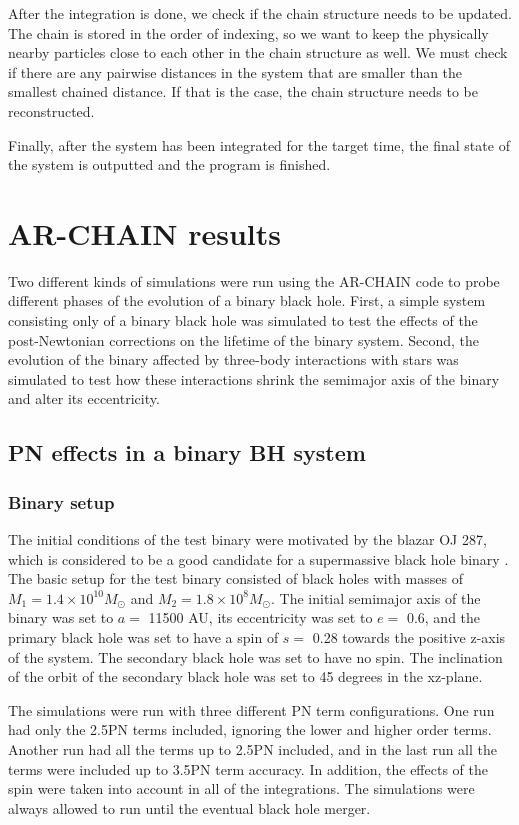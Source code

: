 \documentclass[english, oneside]{HYgradu}
\begin{document}
After the integration is done, we check if the chain structure needs to be updated. The chain is stored in the order of indexing, so we want to keep the physically nearby particles close to each other in the chain structure as well. We must check if there are any pairwise distances in the system that are smaller than the smallest chained distance. If that is the case, the chain structure needs to be reconstructed.

Finally, after the system has been integrated for the target time, the final state of the system is outputted and the program is finished.


\chapter{AR-CHAIN results}

Two different kinds of simulations were run using the AR-CHAIN code to probe different phases of the evolution of a binary black hole. First, a simple system consisting only of a binary black hole was simulated to test the effects of the post-Newtonian corrections on the lifetime of the binary system. Second, the evolution of the binary affected by three-body interactions with stars was simulated to test how these interactions shrink the semimajor axis of the binary and alter its eccentricity.

\section{PN effects in a binary BH system}
\subsection{Binary setup}

The initial conditions of the test binary were motivated by the blazar OJ 287, which is considered to be a good candidate for a supermassive black hole binary \citep{valtonen:1996, dey:2019}. The basic setup for the test binary consisted of black holes with masses of $M_1 = 1.4 \times 10^{10} M_\odot$ and $M_2 = 1.8 \times 10^{8} M_\odot$. The initial semimajor axis of the binary was set to $a =$ 11500 AU, its eccentricity was set to $e =$ 0.6, and the primary black hole was set to have a spin of $s =$ 0.28 towards the positive z-axis of the system. The secondary black hole was set to have no spin. The inclination of the orbit of the secondary black hole was set to 45 degrees in the xz-plane. 

The simulations were run with three different PN term configurations. One run had only the 2.5PN terms included, ignoring the lower and higher order terms. Another run had all the terms up to 2.5PN included, and in the last run all the terms were included up to 3.5PN term accuracy. In addition, the effects of the spin were taken into account in all of the integrations. The simulations were always allowed to run until the eventual black hole merger.
\end{document}
